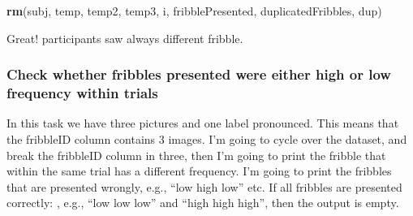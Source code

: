 \documentclass[
]{article}
\newenvironment{Shaded}{\begin{snugshade}}{\end{snugshade}}
\newcommand{\KeywordTok}[1]{\textcolor[rgb]{0.13,0.29,0.53}{\textbf{#1}}}
\newcommand{\NormalTok}[1]{#1}
\begin{document}
\begin{Shaded}
\begin{Highlighting}[]
\KeywordTok{rm}\NormalTok{(subj, temp, temp2, temp3, i, fribblePresented, duplicatedFribbles, dup)}
\end{Highlighting}
\end{Shaded}

Great! participants saw always different fribble.

\hypertarget{check-whether-fribbles-presented-were-either-high-or-low-frequency-within-trials}{%
\subsubsection{Check whether fribbles presented were either high or low
frequency within
trials}\label{check-whether-fribbles-presented-were-either-high-or-low-frequency-within-trials}}

In this task we have three pictures and one label pronounced. This means
that the fribbleID column contains 3 images. I'm going to cycle over the
dataset, and break the fribbleID column in three, then I'm going to
print the fribble that within the same trial has a different frequency.
I'm going to print the fribbles that are presented wrongly, e.g., ``low
high low'' etc. If all fribbles are presented correctly: , e.g., ``low
low low'' and ``high high high'', then the output is empty.
\end{document}
